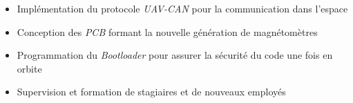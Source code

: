 {\vspace{-12pt}
\begin{itemize}
    \item Implémentation du protocole \textit{UAV-CAN} pour la communication dans l'espace
    \item Conception des \textit{PCB} formant la nouvelle génération de magnétomètres
    \item Programmation du \textit{Bootloader} pour assurer la sécurité du code une fois en orbite
    \item Supervision et formation de stagiaires et de nouveaux employés
\end{itemize}}
    

